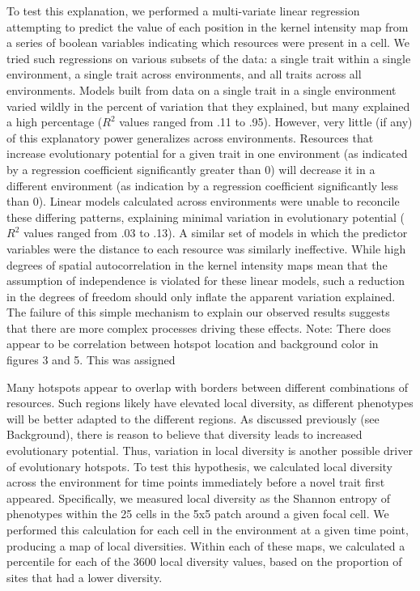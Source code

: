 To test this explanation, we performed a multi-variate linear regression attempting to predict the value of each position in the kernel intensity map from a series of boolean variables indicating which resources were present in a cell. We tried such regressions on various subsets of the data: a single trait within a single environment, a single trait across environments, and all traits across all environments. Models built from data on a single trait in a single environment varied wildly in the percent of variation that they explained, but many explained a high percentage ($R^{2}$ values ranged from .11 to .95). However, very little (if any) of this explanatory power generalizes across environments. Resources that increase evolutionary potential for a given trait in one environment (as indicated by a regression coefficient significantly greater than 0) will decrease it in a different environment (as indication by a regression coefficient significantly less than 0). Linear models calculated across environments were unable to reconcile these differing patterns, explaining minimal variation in evolutionary potential ($R^{2}$ values ranged from .03 to .13). A similar set of models in which the predictor variables were the distance to each resource was similarly ineffective. While high degrees of spatial autocorrelation in the kernel intensity maps mean that the assumption of independence is violated for these linear models, such a reduction in the degrees of freedom should only inflate the apparent variation explained. The failure of this simple mechanism to explain our observed results suggests that there are more complex processes driving these effects. Note: There does appear to be correlation between hotspot location and background color in figures 3 and 5. This was assigned  

Many hotspots appear to overlap with borders between different combinations of resources. Such regions likely have elevated local diversity, as different phenotypes will be better adapted to the different regions. As discussed previously (see Background), there is reason to believe that diversity leads to increased evolutionary potential. Thus, variation in local diversity is another possible driver of evolutionary hotspots. To test this hypothesis, we calculated local diversity across the environment for time points immediately before a novel trait first appeared. Specifically, we measured local diversity as the Shannon entropy of phenotypes within the 25 cells in the 5x5 patch around a given focal cell. We performed this calculation for each cell in the environment at a given time point, producing a map of local diversities. Within each of these maps, we calculated a percentile for each of the 3600 local diversity values, based on the proportion of sites that had a lower diversity.


